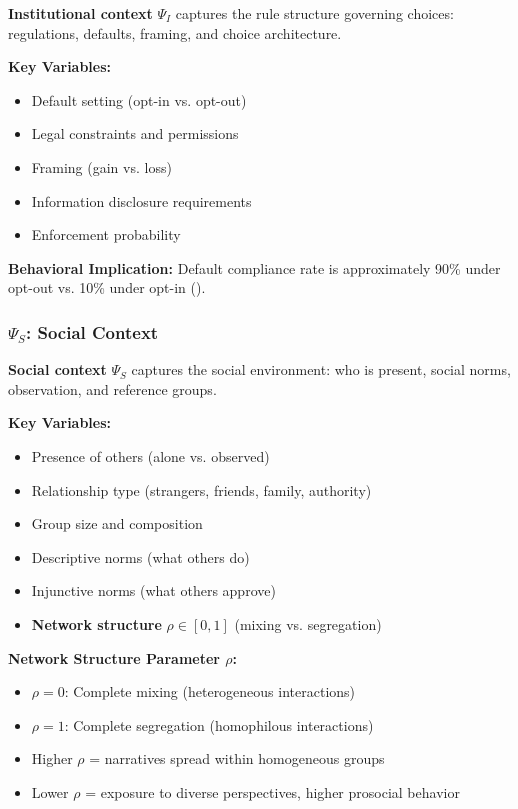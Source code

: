 \begin{definition}
\textbf{Institutional context} $\Psi_I$ captures the rule structure governing choices:
regulations, defaults, framing, and choice architecture.
\end{definition}

\textbf{Key Variables:}
\begin{itemize}[nosep]
\item Default setting (opt-in vs. opt-out)
\item Legal constraints and permissions
\item Framing (gain vs. loss)
\item Information disclosure requirements
\item Enforcement probability
\end{itemize}

\textbf{Behavioral Implication:}
Default compliance rate is approximately 90\% under opt-out vs. 10\% under opt-in
(\citet{johnson2003defaults}).

\subsubsection{$\Psi_S$: Social Context}

\begin{definition}
\textbf{Social context} $\Psi_S$ captures the social environment:
who is present, social norms, observation, and reference groups.
\end{definition}

\textbf{Key Variables:}
\begin{itemize}[nosep]
\item Presence of others (alone vs. observed)
\item Relationship type (strangers, friends, family, authority)
\item Group size and composition
\item Descriptive norms (what others do)
\item Injunctive norms (what others approve)
\item \textbf{Network structure} $\rho \in [0,1]$ (mixing vs. segregation)
\end{itemize}

\textbf{Network Structure Parameter $\rho$:}
\begin{itemize}[nosep]
\item $\rho = 0$: Complete mixing (heterogeneous interactions)
\item $\rho = 1$: Complete segregation (homophilous interactions)
\item Higher $\rho$ = narratives spread within homogeneous groups
\item Lower $\rho$ = exposure to diverse perspectives, higher prosocial behavior
\end{itemize}

